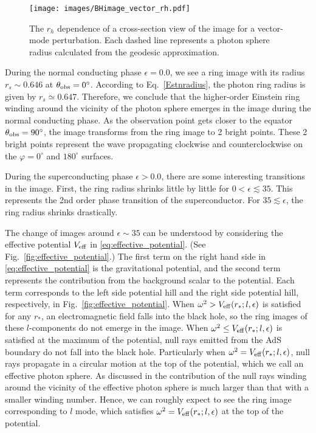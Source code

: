 \documentclass[a4paper,11pt]{article}
\begin{document}
\begin{figure}
    \centering
    \texttt{[image: images/BHimage\_vector\_rh.pdf]}
        \caption{The $r_h$ dependence of a cross-section view of the image for a vector-mode perturbation. Each dashed line represents a photon sphere radius calculated from the geodesic approximation.}
        \label{fig:BHimage_vector_rh}
\end{figure}

    During the normal conducting phase $\epsilon=0.0$, we see a ring image with its radius $r_s\sim 0.646$ at $\theta_{\rm{obs}}=0^\circ$. 
    According to  Eq.~\eqref{Estnradius}, the photon ring radius is given by $r_s \simeq 0.647$. Therefore, we conclude that the higher-order Einstein ring winding around the vicinity of the photon sphere emerges in the image during the normal conducting phase.
    As the observation point gets closer to the equator $\theta_{\rm{obs}}=90^\circ$, the image transforms from the ring image to 2 bright points. These 2 bright points represent the wave propagating clockwise and counterclockwise on the $\varphi=0^\circ$ and $180^\circ$ surfaces.

    During the superconducting phase $\epsilon >0.0$, there are some interesting transitions in the image. First, the ring radius shrinks little by little for $0 < \epsilon \lesssim 35$. This represents the 2nd order phase transition of the superconductor. For $35 \lesssim \epsilon$, the ring radius shrinks drastically. 

    The change of images around $\epsilon \sim 35$ can be understood by considering the effective potential $V_{\rm{eff}}$ in \eqref{eq:effective_potential}. (See Fig.~\ref{fig:effective_potential}.) 
    The first term on the right hand side in \eqref{eq:effective_potential} is the gravitational potential, and the second term represents the contribution from the background scalar to the potential. Each term corresponds to the left side potential hill and the right side potential hill, respectively, in Fig.~\ref{fig:effective_potential}. 
    When $\omega^2>V_{\rm{eff}}(r_*;l,\epsilon)$ is satisfied for any $r_*$, an electromagnetic field falls into the black hole, so the ring images of these $l$-components do not emerge in the image.  
    When $\omega^2 \leq V_{\rm{eff}}(r_*;l,\epsilon)$ is satisfied at the maximum of the potential, null rays emitted from the AdS boundary do not fall into the black hole. 
    Particularly when $\omega^2 = V_{\rm{eff}}(r_*;l,\epsilon)$, null rays propagate in a circular motion at the top of the potential, which we call an effective photon sphere. As discussed in \cite{Hashimoto:2018okj,Hashimoto:2019jmw} the contribution of the null rays winding around the vicinity of the effective photon sphere is much larger than that with a smaller winding number. Hence, we can roughly expect to see the ring image corresponding to $l$ mode, which satisfies $\omega^2 = V_{\rm{eff}}(r_*;l,\epsilon)$ at the top of the potential.
\end{document}
